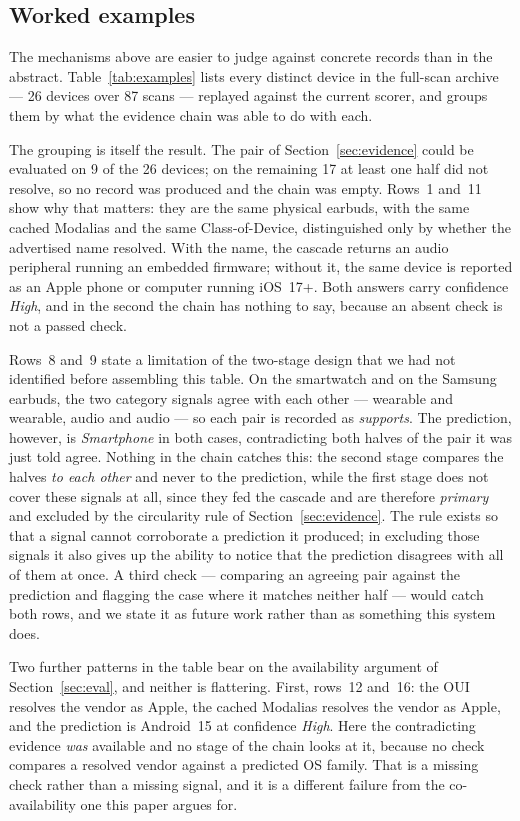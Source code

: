 \documentclass[conference]{IEEEtran}
\begin{document}
\subsection{Worked examples}\label{sec:examples}
The mechanisms above are easier to judge against concrete records than in the
abstract. Table~\ref{tab:examples} lists every distinct device in the full-scan
archive --- 26 devices over 87 scans --- replayed against the current scorer,
and groups them by what the evidence chain was able to do with each.

The grouping is itself the result. The pair of Section~\ref{sec:evidence} could
be evaluated on 9 of the 26 devices; on the remaining 17 at least one half did
not resolve, so no record was produced and the chain was empty. Rows~1 and~11
show why that matters: they are the same physical earbuds, with the same cached
Modalias and the same Class-of-Device, distinguished only by whether the
advertised name resolved. With the name, the cascade returns an audio
peripheral running an embedded firmware; without it, the same device is
reported as an Apple phone or computer running iOS~17+. Both answers carry
confidence \emph{High}, and in the second the chain has nothing to say, because
an absent check is not a passed check.

Rows~8 and~9 state a limitation of the two-stage design that we had not
identified before assembling this table. On the smartwatch and on the Samsung
earbuds, the two category signals agree with each other --- wearable and
wearable, audio and audio --- so each pair is recorded as \emph{supports}. The
prediction, however, is \emph{Smartphone} in both cases, contradicting both
halves of the pair it was just told agree. Nothing in the chain catches this:
the second stage compares the halves \emph{to each other} and never to the
prediction, while the first stage does not cover these signals at all, since
they fed the cascade and are therefore \emph{primary} and excluded by the
circularity rule of Section~\ref{sec:evidence}. The rule exists so that a
signal cannot corroborate a prediction it produced; in excluding those signals
it also gives up the ability to notice that the prediction disagrees with all
of them at once. A third check --- comparing an agreeing pair against the
prediction and flagging the case where it matches neither half --- would catch
both rows, and we state it as future work rather than as something this system
does.

Two further patterns in the table bear on the availability argument of
Section~\ref{sec:eval}, and neither is flattering. First, rows~12 and~16: the
OUI resolves the vendor as Apple, the cached Modalias resolves the vendor as
Apple, and the prediction is Android~15 at confidence \emph{High}. Here the
contradicting evidence \emph{was} available and no stage of the chain looks at
it, because no check compares a resolved vendor against a predicted OS
family. That is a missing check rather than a missing signal, and it is a
different failure from the co-availability one this paper argues for.
\end{document}
